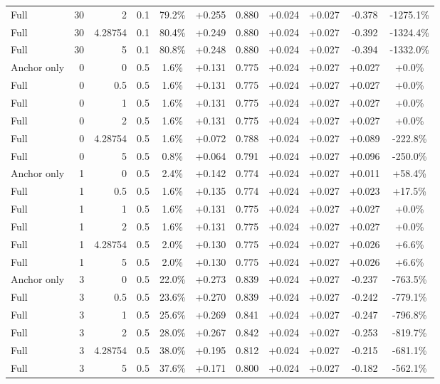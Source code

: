 \begin{table}[htbp]
\begin{tabular}{lrrrccccccc}
Full & 30 & 2 & 0.1 & 79.2\% & +0.255 & 0.880 & +0.024 & +0.027 & -0.378 & -1275.1\% \\
Full & 30 & 4.28754 & 0.1 & 80.4\% & +0.249 & 0.880 & +0.024 & +0.027 & -0.392 & -1324.4\% \\
Full & 30 & 5 & 0.1 & 80.8\% & +0.248 & 0.880 & +0.024 & +0.027 & -0.394 & -1332.0\% \\
Anchor only & 0 & 0 & 0.5 & 1.6\% & +0.131 & 0.775 & +0.024 & +0.027 & +0.027 & +0.0\% \\
Full & 0 & 0.5 & 0.5 & 1.6\% & +0.131 & 0.775 & +0.024 & +0.027 & +0.027 & +0.0\% \\
Full & 0 & 1 & 0.5 & 1.6\% & +0.131 & 0.775 & +0.024 & +0.027 & +0.027 & +0.0\% \\
Full & 0 & 2 & 0.5 & 1.6\% & +0.131 & 0.775 & +0.024 & +0.027 & +0.027 & +0.0\% \\
Full & 0 & 4.28754 & 0.5 & 1.6\% & +0.072 & 0.788 & +0.024 & +0.027 & +0.089 & -222.8\% \\
Full & 0 & 5 & 0.5 & 0.8\% & +0.064 & 0.791 & +0.024 & +0.027 & +0.096 & -250.0\% \\
Anchor only & 1 & 0 & 0.5 & 2.4\% & +0.142 & 0.774 & +0.024 & +0.027 & +0.011 & +58.4\% \\
Full & 1 & 0.5 & 0.5 & 1.6\% & +0.135 & 0.774 & +0.024 & +0.027 & +0.023 & +17.5\% \\
Full & 1 & 1 & 0.5 & 1.6\% & +0.131 & 0.775 & +0.024 & +0.027 & +0.027 & +0.0\% \\
Full & 1 & 2 & 0.5 & 1.6\% & +0.131 & 0.775 & +0.024 & +0.027 & +0.027 & +0.0\% \\
Full & 1 & 4.28754 & 0.5 & 2.0\% & +0.130 & 0.775 & +0.024 & +0.027 & +0.026 & +6.6\% \\
Full & 1 & 5 & 0.5 & 2.0\% & +0.130 & 0.775 & +0.024 & +0.027 & +0.026 & +6.6\% \\
Anchor only & 3 & 0 & 0.5 & 22.0\% & +0.273 & 0.839 & +0.024 & +0.027 & -0.237 & -763.5\% \\
Full & 3 & 0.5 & 0.5 & 23.6\% & +0.270 & 0.839 & +0.024 & +0.027 & -0.242 & -779.1\% \\
Full & 3 & 1 & 0.5 & 25.6\% & +0.269 & 0.841 & +0.024 & +0.027 & -0.247 & -796.8\% \\
Full & 3 & 2 & 0.5 & 28.0\% & +0.267 & 0.842 & +0.024 & +0.027 & -0.253 & -819.7\% \\
Full & 3 & 4.28754 & 0.5 & 38.0\% & +0.195 & 0.812 & +0.024 & +0.027 & -0.215 & -681.1\% \\
Full & 3 & 5 & 0.5 & 37.6\% & +0.171 & 0.800 & +0.024 & +0.027 & -0.182 & -562.1\% \\

\end{tabular}
\end{table}
